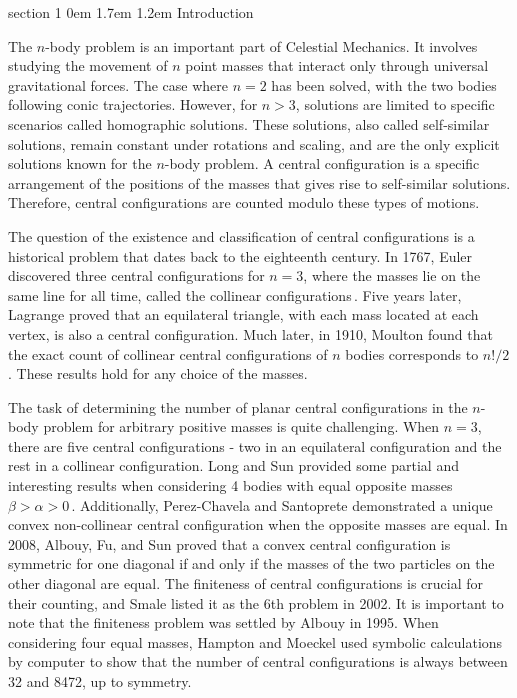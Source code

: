 \documentclass[final,11pt]{article}
\makeatletter
\renewcommand{\section}{\@startsection%
{section}%
{1}%
{0em}%
{1.7em}%
{1.2em}%
{\normalfont\large\centering\bfseries}}
\numberwithin{equation}{section}
\theoremstyle{definition}
\makeatother
\begin{document}
\section{Introduction}\label{sec1}

The $n$-body problem is an important part of Celestial Mechanics. It involves studying the movement of $n$ point masses that interact only through universal gravitational forces. The case where $n=2$ has been solved, with the two bodies following conic trajectories. However, for $n>3$, solutions are limited to specific scenarios called homographic solutions. These solutions, also called self-similar solutions, remain constant under rotations and scaling, and are the only explicit solutions known for the $n$-body problem. A central configuration is a specific arrangement of the positions of the masses that gives rise to self-similar solutions.  Therefore, central configurations are counted modulo these types of motions.

The question of the existence and classification of central configurations is a historical problem that dates back to the eighteenth century. In 1767, Euler \cite{MR3297886} discovered three central configurations for $n=3$, where the masses lie on the same line for all time, called the collinear configurations\,. Five years later, Lagrange \cite{La} proved that an equilateral triangle, with each mass located at each vertex, is also a central configuration. Much later, in 1910, Moulton \cite{MR1503509} found that the exact count of collinear central configurations of $n$ bodies corresponds to $n!/2$. These results hold for any choice of the masses.

The task of determining the number of planar central configurations in the $n$-body problem for arbitrary positive masses is quite challenging. When $n=3$, there are five central configurations - two in an equilateral configuration and the rest in a collinear configuration. Long and Sun \cite{MR1892230} provided some partial and interesting results when considering 4 bodies with equal opposite masses $\beta>\alpha >0$\,. Additionally, Perez-Chavela and Santoprete \cite{MR2322818} demonstrated a unique convex non-collinear central configuration when the opposite masses are equal. In 2008, Albouy, Fu, and Sun \cite{MR2386651} proved that a convex central configuration is symmetric for one diagonal if and only if the masses of the two particles on the other diagonal are equal. The finiteness of central configurations is crucial for their counting, and Smale \cite{MR1754783} listed it as the 6th problem in 2002. It is important to note that the finiteness problem was settled by Albouy \cite{MR1320359} in 1995. When considering four equal masses, Hampton and Moeckel \cite{MR2207019} used symbolic calculations by computer to show that the number of central configurations is always between 32 and 8472, up to symmetry.
\end{document}
